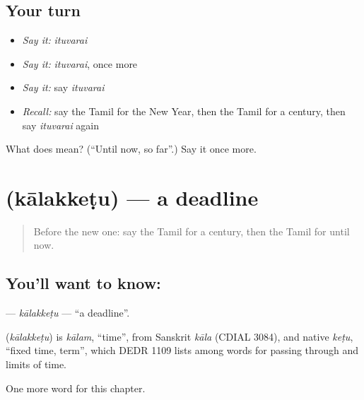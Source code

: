 \subsection*{Your turn}
\begin{itemize}
\raggedright
  \item \emph{Say it:} \emph{ituvarai}
  \item \emph{Say it:} \emph{ituvarai}, once more
  \item \emph{Say it:} say \emph{ituvarai}
  \item \emph{Recall:} say the Tamil for the New Year, then the Tamil for a century, then say \emph{ituvarai} again
\end{itemize}

\begin{tcolorbox}[breakable,colback=teal!4,colframe=teal!35!black,title={Before you move on}]
What does  mean? (\textquotedblleft{}Until now, so far\textquotedblright{}.) Say it once more.
\end{tcolorbox}
\section[\texorpdfstring{\ta{காலக்கெடு} (kālakkeṭu)}{காலக்கெடு (kālakkeṭu)}]{ (kālakkeṭu) — a deadline}

\label{lesson:TA-C203-kalakketu}



\begin{quote}
Before the new one: say the Tamil for a century, then the Tamil for until now.
\end{quote}

\subsection*{You'll want to know: }
\textbf{} — \emph{kālakkeṭu} — \textquotedblleft{}a deadline\textquotedblright{}.

\begin{cousinweb}
\textbf{} (\emph{kālakkeṭu}) is \emph{kālam}, \textquotedblleft{}time\textquotedblright{}, from Sanskrit \emph{kāla} (CDIAL 3084), and native \emph{keṭu}, \textquotedblleft{}fixed time, term\textquotedblright{}, which DEDR 1109 lists among words for passing through and limits of time.
\end{cousinweb}

\begin{grammarlens}[title={What you've built}]
One more word for this chapter.
\end{grammarlens}

